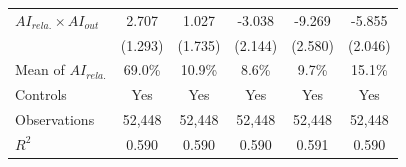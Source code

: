 \begin{table}[htbp]
\begin{threeparttable}
\begin{tabular}{l*{5}{c}}
\addlinespace
$AI_{rela.} \times AI_{out}$&       2.707\sym{**} &       1.027         &      -3.038         &      -9.269\sym{***}&      -5.855\sym{***}\\
            &     (1.293)         &     (1.735)         &     (2.144)         &     (2.580)         &     (2.046)         \\
\midrule
Mean of $AI_{rela.}$&      69.0\%         &      10.9\%         &       8.6\%         &       9.7\%         &      15.1\%         \\
Controls    &         Yes         &         Yes         &         Yes         &         Yes         &         Yes         \\
Observations&      52,448         &      52,448         &      52,448         &      52,448         &      52,448         \\
$R^2$       &       0.590         &       0.590         &       0.590         &       0.591         &       0.590         \\
\bottomrule\bottomrule
\end{tabular}
\end{threeparttable}
\end{table}
